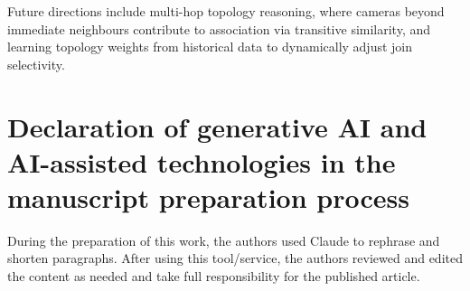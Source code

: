 \documentclass[5p,times]{elsarticle}
\begin{document}
Future directions include multi-hop topology reasoning, where cameras beyond immediate neighbours contribute to association via transitive similarity, and learning topology weights from historical data to dynamically adjust join selectivity.

\section*{Declaration of generative AI and AI-assisted technologies in the manuscript preparation process}
 During the preparation of this work, the authors used Claude to rephrase and shorten paragraphs. After using this tool/service, the authors reviewed and edited the content as needed and take full responsibility for the published article.
 
% 
% 
% 
\end{document}
